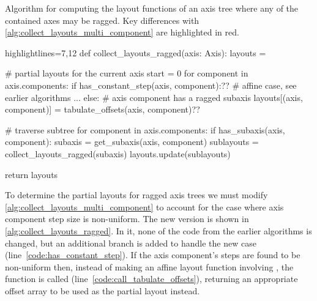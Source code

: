 \documentclass[thesis]{subfiles}
\begin{document}
\begin{algorithm}
  \caption{
    Algorithm for computing the layout functions of an axis tree where any of the contained axes may be ragged.
    Key differences with \cref{alg:collect_layouts_multi_component} are highlighted in red.
  }

  \begin{center}
    \begin{minipage}{.9\textwidth}
      \begin{pyalg2*}{highlightlines={7,12}}
        def collect_layouts_ragged(axis: Axis):
          layouts = {}

          # partial layouts for the current axis
          start = 0
          for component in axis.components:
            if has_constant_step(axis, component):?\label{code:has_constant_step}?
              # affine case, see earlier algorithms
              ...
            else:
              # axis component has a ragged subaxis
              layouts[(axis, component)] = tabulate_offsets(axis, component)?\label{code:call_tabulate_offsets}?

          # traverse subtree
          for component in axis.components:
            if has_subaxis(axis, component): 
              subaxis = get_subaxis(axis, component)
              sublayouts = collect_layouts_ragged(subaxis)
              layouts.update(sublayouts)

          return layouts
      \end{pyalg2*}
    \end{minipage}
  \end{center}
  \label{alg:collect_layouts_ragged}
\end{algorithm}

To determine the partial layouts for ragged axis trees we must modify \cref{alg:collect_layouts_multi_component} to account for the case where axis component step size is non-uniform.
The new version is shown in \cref{alg:collect_layouts_ragged}.
In it, none of the code from the earlier algorithms is changed, but an additional branch is added to handle the new case (line~\ref{code:has_constant_step}).
If the axis component's steps are found to be non-uniform then, instead of making an affine layout function involving , the function  is called (line~\ref{code:call_tabulate_offsets}), returning an appropriate offset array to be used as the partial layout instead.
\end{document}
